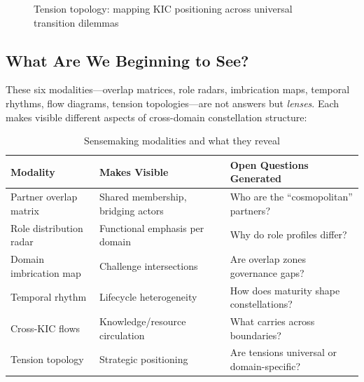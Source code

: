 \begin{figure}[htbp]
\caption{Tension topology: mapping KIC positioning across universal transition dilemmas}
\label{fig:tension-topology}
\end{figure}

\subsection{What Are We Beginning to See?}

These six modalities---overlap matrices, role radars, imbrication maps, temporal rhythms, flow diagrams, tension topologies---are not answers but \textit{lenses}. Each makes visible different aspects of cross-domain constellation structure:

\begin{table}[htbp]
\centering\small
\caption{Sensemaking modalities and what they reveal}
\label{tab:modalities}
\begin{tabular}{@{}p{3cm}p{4cm}p{4.5cm}@{}}
\toprule
\textbf{Modality} & \textbf{Makes Visible} & \textbf{Open Questions Generated} \\
\midrule
Partner overlap matrix & Shared membership, bridging actors & Who are the ``cosmopolitan'' partners? \\
Role distribution radar & Functional emphasis per domain & Why do role profiles differ? \\
Domain imbrication map & Challenge intersections & Are overlap zones governance gaps? \\
Temporal rhythm & Lifecycle heterogeneity & How does maturity shape constellations? \\
Cross-KIC flows & Knowledge/resource circulation & What carries across boundaries? \\
Tension topology & Strategic positioning & Are tensions universal or domain-specific? \\
\bottomrule
\end{tabular}
\end{table}

